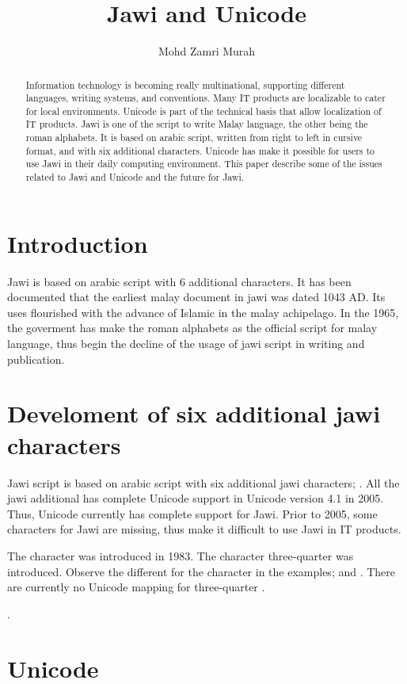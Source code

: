 \documentclass[a4paper]{article}
\title{Jawi and Unicode}
\author{Mohd Zamri Murah}
\begin{document}
\maketitle
\begin{abstract}
Information technology is becoming really multinational, supporting different languages, writing systems, and conventions. Many IT products are localizable to cater for local environments. Unicode is part of the technical basis that allow localization of IT products. Jawi is one of the script to write Malay language, the other being the roman alphabets. It is based on arabic script, written from right to left in cursive format, and with six additional characters. Unicode has make it possible for users to use Jawi in their daily computing environment. This paper describe some of the issues related to Jawi and Unicode and the future for Jawi.

\end{abstract}

\section{Introduction}

Jawi is based on arabic script with 6 additional characters. It has been documented that the earliest malay  document in jawi was dated 1043 AD. Its uses flourished with the advance of Islamic in the malay achipelago. In the 1965, the goverment has make the roman alphabets as the official script for malay language, thus begin the decline of the usage of jawi script in writing and publication.

\section{Develoment of six additional jawi characters}

Jawi script is based on arabic script with six additional jawi characters; . All the jawi additional has complete Unicode support in Unicode version 4.1 in 2005. Thus, Unicode currently has complete support for Jawi. Prior to 2005, some characters for Jawi are missing, thus make it difficult to use Jawi in IT products.

The character  was introduced in 1983\cite{musa2006}. The character three-quarter \textarab{\raisebox{4pt}{ء}} was introduced. Observe the different for the character  in the examples;
 and . There are currently no Unicode mapping for three-quarter \textarab{\raisebox{4pt}{ء}}.



\raisebox{2pt}{L}\raisebox{-2pt}{A}.
\section{Unicode}





\cite{jukka2006}




\end{document}
